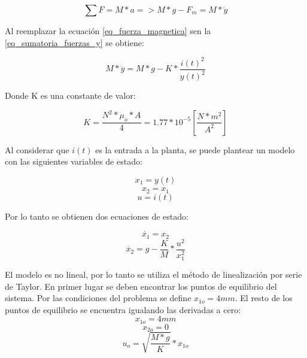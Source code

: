 \begin{equation}\label{eq_sumatoria_fuerzas_y}
	\sum F=M*a=>M*g-F_{m}=M*\ddot{y}
\end{equation}

\noindent Al reemplazar la ecuación \ref{eq_fuerza_magnetica} sen la \ref{eq_sumatoria_fuerzas_y} se obtiene:

\begin{equation}\label{eq_sumatoria_fuerzas_y_2}
	M*\ddot{y}=M*g-K*\frac{i(t)^{2}}{y(t)^{2}}
\end{equation}

\noindent Donde K es una constante de valor:

\begin{equation}
	K=\frac{N^{2}*\mu_{o}*A}{4}=1.77*10^{-5} [\frac{N*m^2}{A^2}]
\end{equation}

\noindent Al considerar que $i(t)$ es la entrada a la planta, se puede plantear un modelo con las siguientes variables de estado:\newline

\begin{equation}
	x_{1}=y(t)
\end{equation}
\begin{equation}
	x_{2}=\dot{x_{1}}
\end{equation}
\begin{equation}
	u=i(t)
\end{equation}

\noindent Por lo tanto se obtienen dos ecuaciones de estado:

\begin{equation}
	\dot{x_{1}}=x_{2}
\end{equation}
\begin{equation}
	\dot{x_{2}}=g-\frac{K}{M}*\frac{u^{2}}{x_{1}^{2}}
\end{equation}

\noindent El modelo es no lineal, por lo tanto se utiliza el método de linealización por serie de Taylor. En primer lugar se deben encontrar los puntos de equilibrio del sistema. Por las condiciones del problema se define $x_{1o}=4mm$. El resto de los puntos de equilibrio se encuentra igualando las derivadas a cero:
\begin{equation}
	x_{1o}=4mm
\end{equation}
\begin{equation}
	x_{2o}=0
\end{equation}
\begin{equation}
	u_{o}=\sqrt{\frac{M*g}{K}}*x_{1o}
\end{equation}

